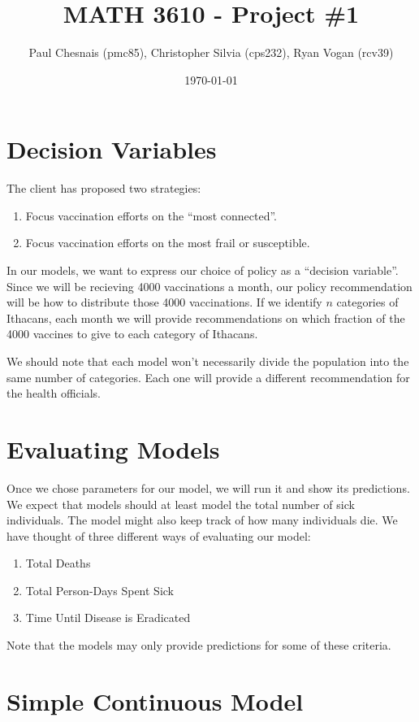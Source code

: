 \documentclass{article}
\title{MATH 3610 - Project \#1}
\author{Paul Chesnais (pmc85), Christopher Silvia (cps232), Ryan Vogan (rcv39)}
\date{\today}
\begin{document}
\maketitle
\thispagestyle{fancy}

\section{Decision Variables}

The client has proposed two strategies:

\begin{enumerate}
\item Focus vaccination efforts on the ``most connected''.
\item Focus vaccination efforts on the most frail or susceptible.
\end{enumerate}

In our models, we want to express our choice of policy as a ``decision variable''.
Since we will be recieving 4000 vaccinations a month, our policy recommendation
	will be how to distribute those 4000 vaccinations.
If we identify $n$ categories of Ithacans, each month we will provide
	recommendations on which fraction of the 4000 vaccines to give to
	each category of Ithacans.

We should note that each model won't necessarily divide the population into the
	same number of categories.
Each one will provide a different recommendation for the health officials.

\section{Evaluating Models}

Once we chose parameters for our model, we will run it and show its predictions.
We expect that models should at least model the total number of sick
	individuals.
The model might also keep track of how many individuals die.
We have thought of three different ways of evaluating our model:

\begin{enumerate}
\item Total Deaths
\item Total Person-Days Spent Sick
\item Time Until Disease is Eradicated
\end{enumerate}

Note that the models may only provide predictions for some of these criteria.

\section{Simple Continuous Model}
\end{document}
